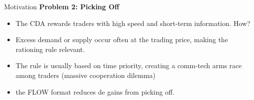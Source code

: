 \documentclass[10pt]{beamer}
\begin{document}
\begin{frame}{Motivation}
    \textbf{Problem 2: Picking Off} 
    \begin{itemize}
        \item The CDA rewards traders with high speed and short-term information. How?
        \item Excess demand or supply occur often at the trading price, making the rationing rule relevant. 
        \item The rule is usually based on time priority, creating a comm-tech arms race among traders (massive cooperation dilemma) %
        \item the FLOW format reduces de gains from picking off.
    \end{itemize}
\end{frame}
\end{document}
